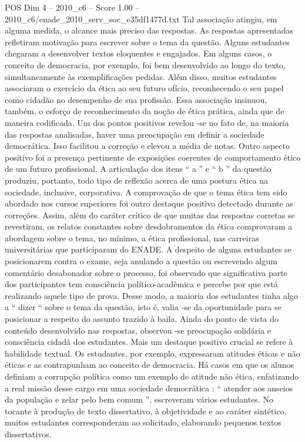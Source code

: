 \begin{textsample}{POS Dim 4 – 2010\_c6 – Score 1.00 – 2010\_c6/enade\_2010\_serv\_soc\_e35df1477d.txt}
Tal associação atingiu, em alguma medida, o alcance mais preciso das respostas.
As respostas apresentadas refletiram motivação para escrever sobre o tema da questão.
Alguns estudantes chegaram a desenvolver textos eloquentes e engajados.
Em alguns casos, o conceito de democracia, por exemplo, foi bem desenvolvido ao longo do texto, simultaneamente às exemplificações pedidas.
Além disso, muitos estudantes associaram o exercício da ética ao seu futuro ofício, reconhecendo o seu papel como cidadão no desempenho de sua profissão.
Essa associação insinuou, também, o esforço de reconhecimento da noção de ética prática, ainda que de maneira codificada.
Um dos pontos positivos revelou -se no fato de, na maioria das respostas analisadas, haver uma preocupação em definir a sociedade democrática.
Isso facilitou a correção e elevou a média de notas.
Outro aspecto positivo foi a presença pertinente de exposições coerentes de comportamento ético de um futuro profissional.
A articulação dos itens “ a ” e “ b ” da questão produziu, portanto, todo tipo de reflexão acerca de uma postura ética na sociedade, inclusive, corporativa.
A comprovação de que o tema ética tem sido abordado nos cursos superiores foi outro destaque positivo detectado durante as correções.
Assim, além do caráter crítico de que muitas das respostas corretas se revestiram, os relatos constantes sobre desdobramentos da ética comprovaram a abordagem sobre o tema, no mínimo, a ética profissional, nas carreiras universitárias que participaram do ENADE.
A despeito de alguns estudantes se posicionarem contra o exame, seja anulando a questão ou escrevendo algum comentário desabonador sobre o processo, foi observado que significativa parte dos participantes tem consciência político-acadêmica e percebe por que está realizando aquele tipo de prova.
Desse modo, a maioria dos estudantes tinha algo a “ dizer “ sobre o tema da questão, isto é, valia -se da oportunidade para se posicionar a respeito do assunto trazido à baila.
Ainda do ponto de vista do conteúdo desenvolvido nas respostas, observou -se preocupação solidária e consciência cidadã dos estudantes.
Mais um destaque positivo crucial se refere à habilidade textual.
Os estudantes, por exemplo, expressaram atitudes éticas e não éticas e as contrapunham ao conceito de democracia.
Há casos em que os alunos definiam a corrupção política como um exemplo de atitude não ética, enfatizando a real missão desse cargo em uma sociedade democrática : “ atender aos anseios da população e zelar pelo bem comum ”, escreveram vários estudantes.
No tocante à produção de texto dissertativo, à objetividade e ao caráter sintético, muitos estudantes corresponderam ao solicitado, elaborando pequenos textos dissertativos.

\end{textsample}
